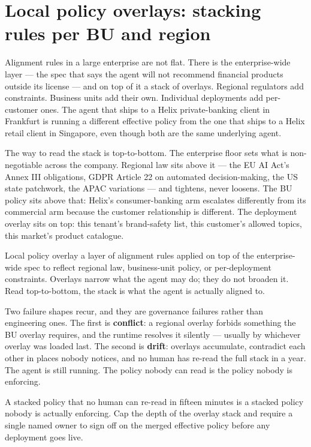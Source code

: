 \section{Local policy overlays: stacking rules per BU and region}

Alignment rules in a large enterprise are not flat. There is the enterprise-wide layer --- the spec that says the agent will not recommend financial products outside its license --- and on top of it a stack of overlays. Regional regulators add constraints. Business units add their own. Individual deployments add per-customer ones. The agent that ships to a Helix private-banking client in Frankfurt is running a different effective policy from the one that ships to a Helix retail client in Singapore, even though both are the same underlying agent.

The way to read the stack is top-to-bottom. The enterprise floor sets what is non-negotiable across the company. Regional law sits above it --- the EU AI Act's Annex III obligations, GDPR Article 22 on automated decision-making, the US state patchwork, the APAC variations --- and tightens, never loosens. The BU policy sits above that: Helix's consumer-banking arm escalates differently from its commercial arm because the customer relationship is different. The deployment overlay sits on top: this tenant's brand-safety list, this customer's allowed topics, this market's product catalogue.

\begin{TNdefinition}{Local policy overlay} a layer of alignment rules applied on top of the enterprise-wide spec to reflect regional law, business-unit policy, or per-deployment constraints. Overlays narrow what the agent may do; they do not broaden it. Read top-to-bottom, the stack is what the agent is actually aligned to.\end{TNdefinition}

Two failure shapes recur, and they are governance failures rather than engineering ones. The first is \textbf{conflict}: a regional overlay forbids something the BU overlay requires, and the runtime resolves it silently --- usually by whichever overlay was loaded last. The second is \textbf{drift}: overlays accumulate, contradict each other in places nobody notices, and no human has re-read the full stack in a year. The agent is still running. The policy nobody can read is the policy nobody is enforcing.

\begin{TNwarning} A stacked policy that no human can re-read in fifteen minutes is a stacked policy nobody is actually enforcing. Cap the depth of the overlay stack and require a single named owner to sign off on the merged effective policy before any deployment goes live.\end{TNwarning}

